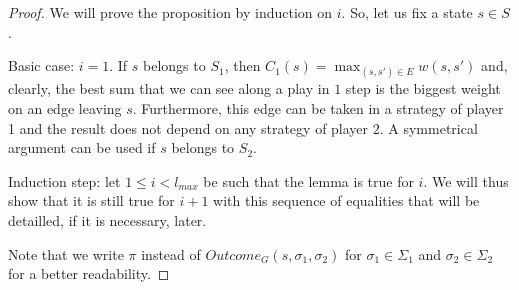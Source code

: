 \documentclass{article}
\theoremstyle{plain}
\begin{document}
\begin{proof}
We will prove the proposition by induction on $i$. So, let us fix a state $s \in S$.

Basic case: $i = 1$. If $s$ belongs to $S_1$, then $C_1(s) = \max_{(s, s') \in E} w(s, s')$ and, clearly, the best sum that we can see along a play in $1$ step is the biggest weight on an edge leaving $s$. Furthermore, this edge can be taken in a strategy of player 1 and the result does not depend on any strategy of player $2$. A symmetrical argument can be used if $s$ belongs to $S_2$.

Induction step: let $1 \leqslant i < l_{max}$ be such that the lemma is true for $i$. We will thus show that it is still true for $i+1$ with this sequence of equalities that will be detailled, if it is necessary, later.

Note that we write $\pi$ instead of $Outcome_G(s, \sigma_1, \sigma_2)$ for $\sigma_1 \in \Sigma_1$ and $\sigma_2 \in \Sigma_2$ for a better readability.


\end{proof}
\end{document}
